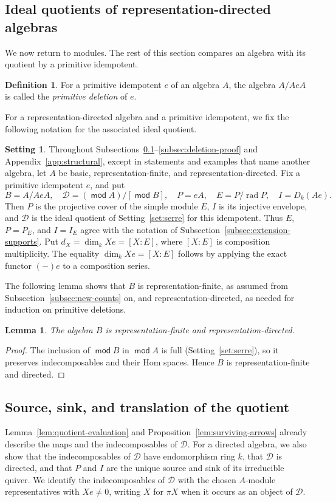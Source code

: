 \documentclass[a4paper,reqno,10pt]{amsart}
\newtheorem{lemma}[theorem]{Lemma}
\theoremstyle{definition}
\newtheorem{definition}[theorem]{Definition}
\newtheorem{setting}[theorem]{Setting}
\numberwithin{equation}{section}
\DeclareMathOperator{\moduleCategory}{\mathsf{mod}}
\renewcommand{\mod}{\moduleCategory}
\DeclareMathOperator{\rad}{rad}
\newcommand{\cD}{\mathcal D}
\newcommand{\Dk}{D_k}
\begin{document}
\subsection{Ideal quotients of representation-directed algebras}\label{set:directed-sub}
We now return to modules. The rest of this section compares an algebra with
its quotient by a primitive idempotent.
\begin{definition}\label{def:primitive-deletion}
For a primitive idempotent \(e\) of an algebra \(A\), the algebra
\(A/AeA\) is called the \emph{primitive deletion} of \(e\).
\end{definition}
For a representation-directed algebra and a primitive idempotent, we fix
the following notation for the associated ideal quotient.
\begin{setting}\label{set:directed}
Throughout Subsections~\ref{set:directed-sub}--\ref{subsec:deletion-proof}
and Appendix~\ref{app:structural}, except in statements and examples that
name another algebra, let \(A\) be basic, representation-finite, and
representation-directed. Fix a primitive
idempotent \(e\), and put
\[
 B=A/AeA,\quad \cD=(\mod A)/[\mod B],\quad
 P=eA,\quad E=P/\rad P,\quad I=\Dk(Ae).
\]
Then \(P\) is the projective cover of the simple module \(E\), \(I\) is
its injective envelope, and \(\cD\) is the ideal quotient of
Setting~\ref{set:serre} for this idempotent. Thus \(E\), \(P=P_E\), and
\(I=I_E\) agree with the notation of
Subsection~\ref{subsec:extension-supports}. Put
\(d_X=\dim_k Xe=[X:E]\), where \([X:E]\) is composition multiplicity.
The equality \(\dim_k Xe=[X:E]\) follows by applying the exact functor
\((-)e\) to a composition series.
\end{setting}

The following lemma shows that \(B\) is representation-finite, as assumed
from Subsection~\ref{subsec:new-counts} on, and representation-directed, as
needed for induction on primitive deletions.
\begin{lemma}\label{lem:quotient-closure}
The algebra \(B\) is
representation-finite and representation-directed.
\end{lemma}
\begin{proof}
The inclusion of \(\mod B\) in \(\mod A\) is full
(Setting~\ref{set:serre}), so it preserves indecomposables and their Hom
spaces. Hence \(B\) is representation-finite and directed.
\end{proof}

\subsection{Source, sink, and translation of the quotient}
Lemma~\ref{lem:quotient-evaluation} and
Proposition~\ref{lem:surviving-arrows} already describe the maps and the
indecomposables of \(\cD\). For a directed algebra, we also show that the
indecomposables of \(\cD\) have endomorphism ring \(k\), that \(\cD\) is
directed, and that \(P\) and \(I\) are the unique source and sink of its
irreducible quiver. We identify the indecomposables of \(\cD\) with the
chosen \(A\)-module representatives with \(Xe\ne0\), writing \(X\) for
\(\pi X\) when it occurs as an object of \(\cD\).
\end{document}
